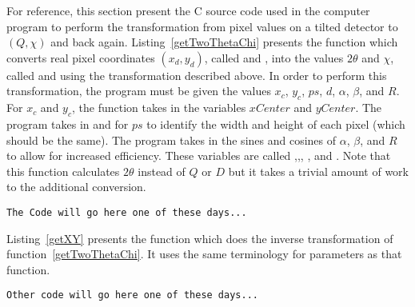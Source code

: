 For reference, this section present the C source 
code used in the computer program to perform the 
transformation from pixel values on a tilted 
detector to $(Q,\chi)$ and back again. 
Listing~\ref{getTwoThetaChi} presents the function
 which converts real pixel
coordinates $(x_d,y_d)$, called 
and , into the values $2\theta$ and $\chi$, 
called  and  using the 
transformation described above. In order to perform 
this transformation, the program must be given
the values $x_c$, $y_c$, $ps$, $d$, 
$\alpha$, $\beta$, and $R$. For $x_c$ and $y_c$, 
the function takes in the variables $xCenter$ and
$yCenter$. The program takes in  
and  for $ps$ to identify the
width and height of each pixel (which should be the 
same). The program takes in the sines and cosines
of $\alpha$, $\beta$, and $R$ to allow for increased
efficiency. These variables are called 
,,,
, and . 
Note that this function calculates $2\theta$ instead
of $Q$ or $D$ but it takes a trivial amount of work
to the additional conversion.
\begin{lstlisting}[caption={Code to convert pixel coordinates on a real detector into $(Q,\chi)$ coordinates},label=getTwoThetaChi]
The Code will go here one of these days...
\end{lstlisting}
Listing~\ref{getXY} presents the function  
which does the inverse transformation of 
function~\ref{getTwoThetaChi}. It uses the same
terminology for parameters as that function.

\begin{lstlisting}[caption={Code to convert $(Q,\chi)$ values into pixel coordinates on a real detector},label=getXY]
Other code will go here one of these days...
\end{lstlisting}



